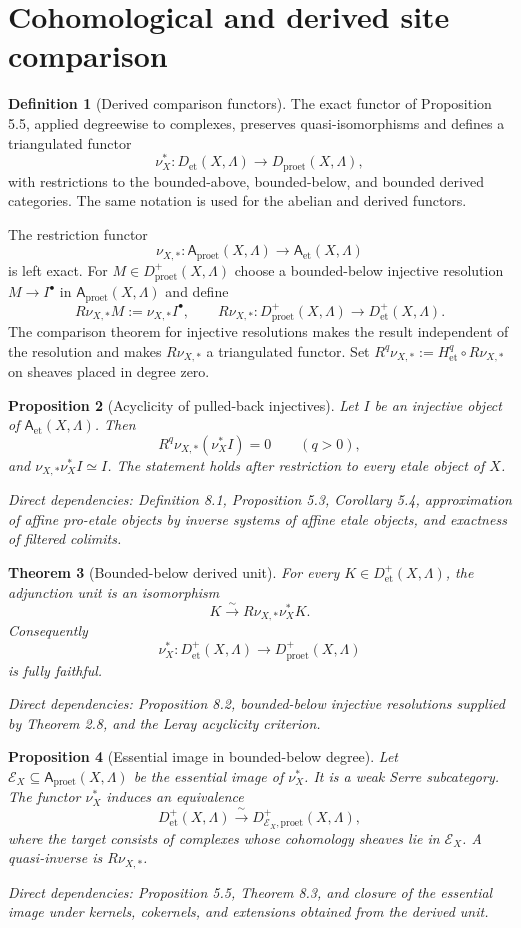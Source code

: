 \documentclass[10pt]{article}
\newtheorem{theorem}{Theorem}[section]
\newtheorem{proposition}[theorem]{Proposition}
\theoremstyle{definition}
\newtheorem{definition}[theorem]{Definition}
\newcommand{\Lam}{\Lambda}
\newcommand{\et}{\mathrm{et}}
\newcommand{\proet}{\mathrm{proet}}
\newcommand{\dep}[1]{\par\smallskip\noindent\textit{Direct dependencies: #1}}
\begin{document}
\section{Cohomological and derived site comparison}

\begin{definition}[Derived comparison functors]
The exact functor of Proposition 5.5, applied degreewise to complexes,
preserves quasi-isomorphisms and defines a triangulated functor
\[
\nu_X^*:D_\et(X,\Lam)\longrightarrow D_\proet(X,\Lam),
\]
with restrictions to the bounded-above, bounded-below, and bounded derived
categories.  The same notation is used for the abelian and derived functors.

The restriction functor
\[
\nu_{X,*}:\mathsf A_\proet(X,\Lam)\longrightarrow
\mathsf A_\et(X,\Lam)
\]
is left exact.  For $M\in D^+_\proet(X,\Lam)$ choose a bounded-below
injective resolution $M\to I^\bullet$ in
$\mathsf A_\proet(X,\Lam)$ and define
\[
R\nu_{X,*}M:=\nu_{X,*}I^\bullet,
\qquad
R\nu_{X,*}:D^+_\proet(X,\Lam)\longrightarrow D^+_\et(X,\Lam).
\]
The comparison theorem for injective resolutions makes the result independent
of the resolution and makes $R\nu_{X,*}$ a triangulated functor.  Set
$R^q\nu_{X,*}:=H^q_\et\circ R\nu_{X,*}$ on sheaves placed in degree zero.
\end{definition}

\begin{proposition}[Acyclicity of pulled-back injectives]
Let $I$ be an injective object of $\mathsf A_\et(X,\Lam)$.  Then
\[
R^q\nu_{X,*}(\nu_X^*I)=0\qquad(q>0),
\]
and $\nu_{X,*}\nu_X^*I\simeq I$.  The statement holds after restriction
to every etale object of $X$.
\dep{Definition 8.1, Proposition 5.3, Corollary 5.4, approximation of affine pro-etale objects
by inverse systems of affine etale objects, and exactness of filtered colimits.}
\end{proposition}

\begin{theorem}[Bounded-below derived unit]
For every $K\in D^+_\et(X,\Lam)$, the adjunction unit is an isomorphism
\[
K\xrightarrow{\sim}R\nu_{X,*}\nu_X^*K.
\]
Consequently
\[
\nu_X^*:D^+_\et(X,\Lam)\longrightarrow D^+_\proet(X,\Lam)
\]
is fully faithful.
\dep{Proposition 8.2, bounded-below injective resolutions supplied by Theorem
2.8, and the Leray acyclicity criterion.}
\end{theorem}

\begin{proposition}[Essential image in bounded-below degree]
Let $\mathcal E_X\subseteq\mathsf A_\proet(X,\Lam)$ be the essential image of
$\nu_X^*$.  It is a weak Serre subcategory.  The functor $\nu_X^*$ induces an
equivalence
\[
D^+_\et(X,\Lam)
\xrightarrow{\ \sim\ }
D^+_{\mathcal E_X,\proet}(X,\Lam),
\]
where the target consists of complexes whose cohomology sheaves lie in
$\mathcal E_X$.  A quasi-inverse is $R\nu_{X,*}$.
\dep{Proposition 5.5, Theorem 8.3, and closure of the essential image under
kernels, cokernels, and extensions obtained from the derived unit.}
\end{proposition}
\end{document}
